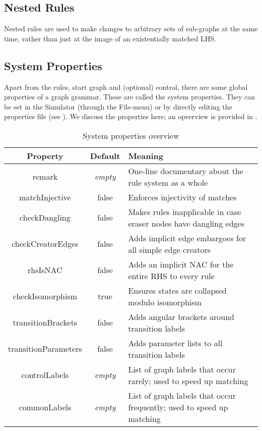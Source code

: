 \subsection{Nested Rules}

Nested rules are used to make changes to arbitrary sets of sub-graphs at the
same time, rather than just at the image of an existentially matched LHS.

\subsection{System Properties}

Apart from the rules, start graph and (optional) control, there are some global
properties of a graph grammar. These are called the system properties. They can
be set in the Simulator (through the \textsf{File}-menu) or by directly editing
the properties file (see ). We discuss the
properties here; an opverview is provided in .

\begin{table}
\begin{center}
\begin{tabular}{|c|c|l|}
\hline\hline
\bf Property & \bf Default & \bf Meaning \\
\hline
\sf remark
  & \it empty
  & One-line documentary about the rule system as a whole \\
\sf matchInjective 
  & \sf false
  & Enforces injectivity of matches \\
\sf checkDangling
  & \sf false
  & Makes rules inapplicable in case eraser nodes have dangling edges \\
\sf checkCreatorEdges
  & \sf false
  & Adds implicit edge embargoes for all simple edge creators \\
\sf rhsIsNAC
  & \sf false
  & Adds an implicit NAC for the entire RHS to every rule \\
\sf checkIsomorphism
  & \sf true
  & Ensures states are collapsed modulo isomorphism \\
\sf transitionBrackets
  & \sf false
  & Adds angular brackets around transition labels
  \\
\sf transitionParameters
  & \sf false
  & Adds parameter lists to all transition labels \\
\sf controlLabels 
  & \it empty
  & List of graph labels that occur rarely; used to speed up matching \\
\sf commonLabels
  & \it empty
  & List of graph labels that occur frequently; used to speed up matching \\
\hline\hline
\end{tabular}
\end{center}
\caption{System properties overview}
\vspace*{-\medskipamount}
\vspace*{-\medskipamount}
\end{table}

